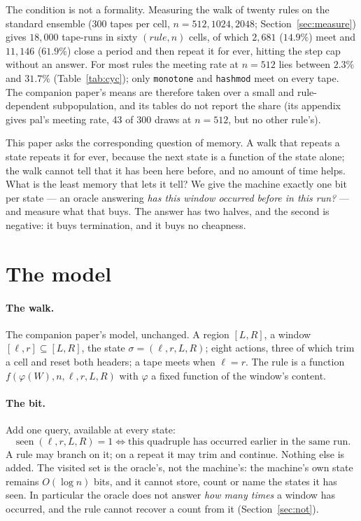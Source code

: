 \documentclass[11pt]{article}
\theoremstyle{remark}
\begin{document}
The condition is not a formality. Measuring the walk of twenty rules on the standard ensemble
($300$ tapes per cell, $n=512,1024,2048$; Section~\ref{sec:measure}) gives $18{,}000$ tape-runs in sixty $(rule,n)$ cells, of which
$2{,}681$ ($14.9\%$) meet and $11{,}146$ ($61.9\%$) close a period and then repeat it for ever, hitting the
step cap without an answer. For most rules the meeting rate at $n=512$ lies between $2.3\%$ and $31.7\%$
(Table~\ref{tab:cyc}); only \texttt{monotone} and \texttt{hashmod} meet on every tape. The companion paper's means
are therefore taken over a small and rule-dependent subpopulation, and its tables do not report the share
(its appendix gives pal's meeting rate, 43 of 300 draws at $n=512$, but no other rule's).

This paper asks the corresponding question of memory. A walk that repeats a state repeats it for ever,
because the next state is a function of the state alone; the walk cannot tell that it has been here before,
and no amount of time helps. What is the least memory that lets it tell? We give the machine exactly one
bit per state --- an oracle answering \emph{has this window occurred before in this run?} --- and measure
what that buys. The answer has two halves, and the second is negative: it buys termination, and it buys no
cheapness.

\section{The model}

\paragraph{The walk.} The companion paper's model, unchanged. A region $[L,R]$, a window
$[\ell,r]\subseteq[L,R]$, the state $\sigma=(\ell,r,L,R)$; eight actions, three of which trim a cell and
reset both headers; a tape meets when $\ell=r$. The rule is a function $f(\varphi(W),n,\ell,r,L,R)$ with
$\varphi$ a fixed function of the window's content.

\paragraph{The bit.} Add one query, available at every state:
\[
\operatorname{seen}(\ell,r,L,R)=1 \iff \text{this quadruple has occurred earlier in the same run.}
\]
A rule may branch on it; on a repeat it may trim and continue. Nothing else is added. The visited set is the
oracle's, not the machine's: the machine's own state remains $O(\log n)$ bits, and it cannot store, count or
name the states it has seen. In particular the oracle does not answer \emph{how many times} a window has
occurred, and the rule cannot recover a count from it (Section~\ref{sec:not}).
\end{document}
